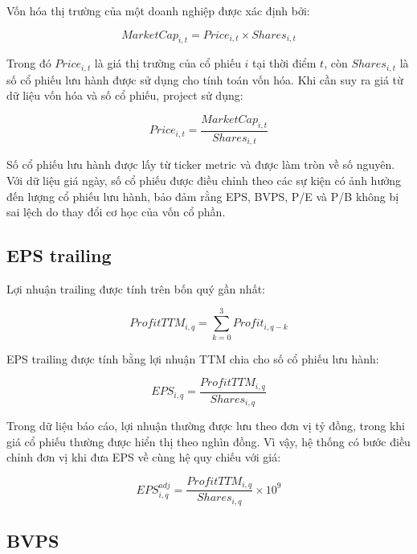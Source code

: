 \documentclass[12pt,a4paper]{article}
\begin{document}
Vốn hóa thị trường của một doanh nghiệp được xác định bởi:

\begin{equation}
    MarketCap_{i,t} = Price_{i,t} \times Shares_{i,t}
\end{equation}

Trong đó $Price_{i,t}$ là giá thị trường của cổ phiếu $i$ tại thời điểm $t$, còn $Shares_{i,t}$ là số cổ phiếu lưu hành được sử dụng cho tính toán vốn hóa. Khi cần suy ra giá từ dữ liệu vốn hóa và số cổ phiếu, project sử dụng:

\begin{equation}
    Price_{i,t} = \frac{MarketCap_{i,t}}{Shares_{i,t}}
\end{equation}

Số cổ phiếu lưu hành được lấy từ ticker metric và được làm tròn về số nguyên. Với dữ liệu giá ngày, số cổ phiếu được điều chỉnh theo các sự kiện có ảnh hưởng đến lượng cổ phiếu lưu hành, bảo đảm rằng EPS, BVPS, P/E và P/B không bị sai lệch do thay đổi cơ học của vốn cổ phần.

\subsection{EPS trailing}

Lợi nhuận trailing được tính trên bốn quý gần nhất:

\begin{equation}
    ProfitTTM_{i,q} = \sum_{k=0}^{3} Profit_{i,q-k}
\end{equation}

EPS trailing được tính bằng lợi nhuận TTM chia cho số cổ phiếu lưu hành:

\begin{equation}
    EPS_{i,q} = \frac{ProfitTTM_{i,q}}{Shares_{i,q}}
\end{equation}

Trong dữ liệu báo cáo, lợi nhuận thường được lưu theo đơn vị tỷ đồng, trong khi giá cổ phiếu thường được hiển thị theo nghìn đồng. Vì vậy, hệ thống có bước điều chỉnh đơn vị khi đưa EPS về cùng hệ quy chiếu với giá:

\begin{equation}
    EPS^{adj}_{i,q} = \frac{ProfitTTM_{i,q}}{Shares_{i,q}} \times 10^9
\end{equation}

\subsection{BVPS}
\end{document}
